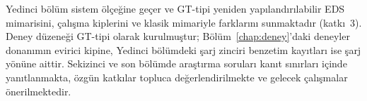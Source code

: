 Yedinci bölüm sistem ölçeğine geçer ve GT-tipi yeniden yapılandırılabilir EDS mimarisini, çalışma kiplerini ve klasik mimariyle farklarını sunmaktadır (katkı~3). Deney düzeneği GT-tipi olarak kurulmuştur; Bölüm~\ref{chap:deney}'daki deneyler donanımın evirici kipine, Yedinci bölümdeki şarj zinciri benzetim kayıtları ise şarj yönüne aittir. Sekizinci ve son bölümde araştırma soruları kanıt sınırları içinde yanıtlanmakta, özgün katkılar topluca değerlendirilmekte ve gelecek çalışmalar önerilmektedir.
